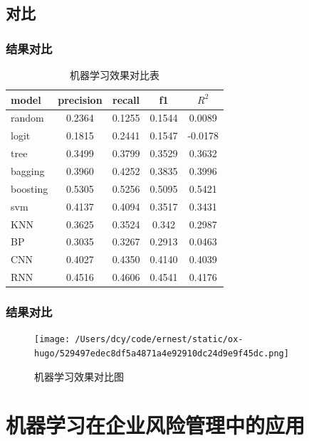 \documentclass[mathserif,envcountsect,fontset=mac]{ctexbeamer}
\begin{document}
\subsection{对比}
\begin{frame}
    \frametitle{结果对比}
    \centering
    \begin{table}
        \caption{机器学习效果对比表}
        \label{result}
        \begin{tabular}{l|cccc}
            model    & precision & recall & f1     & \(R^2\) \\\hline
            random   & 0.2364    & 0.1255 & 0.1544 & 0.0089  \\
            logit    & 0.1815    & 0.2441 & 0.1547 & -0.0178 \\
            tree     & 0.3499    & 0.3799 & 0.3529 & 0.3632  \\
            bagging  & 0.3960    & 0.4252 & 0.3835 & 0.3996  \\
            boosting & 0.5305    & 0.5256 & 0.5095 & 0.5421  \\
            svm      & 0.4137    & 0.4094 & 0.3517 & 0.3431  \\
            KNN      & 0.3625    & 0.3524 & 0.342  & 0.2987  \\
            BP       & 0.3035    & 0.3267 & 0.2913 & 0.0463  \\
            CNN      & 0.4027    & 0.4350 & 0.4140 & 0.4039  \\
            RNN      & 0.4516    & 0.4606 & 0.4541 & 0.4176  \\
        \end{tabular}
    \end{table}

\end{frame}
\begin{frame}
    \frametitle{结果对比}
    \centering
    \begin{figure}
        \texttt{[image: /Users/dcy/code/ernest/static/ox-hugo/529497edec8df5a4871a4e92910dc24d9e9f45dc.png]}
        \caption{机器学习效果对比图}
        \label{contrast}
    \end{figure}
\end{frame}
\section{机器学习在企业风险管理中的应用}
\end{document}
